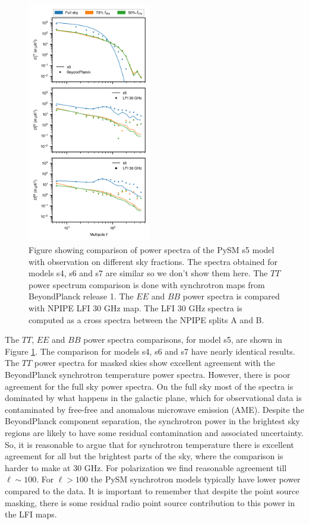 \documentclass[twocolumn]{aastex631}
\begin{document}
\begin{figure}
    \centering
    \includegraphics[width=0.48\textwidth]{figures/Dlcomp_PySM3-4b7_s5_vs_BPnLFI30_BPI.png}
    \caption{Figure showing comparison of power spectra of the PySM s5 model with observation on different sky fractions. The spectra obtained for models s4, s6 and s7 are similar so we don't show them here. The $TT$ power spectrum comparison is done with synchrotron maps from BeyondPlanck release 1. The $EE$ and $BB$ power spectra is compared with NPIPE LFI 30 GHz map. The LFI 30 GHz spectra is computed as a cross spectra between the NPIPE splits A and B.}
    \label{fig:Dl_sync_galmask}
\end{figure}

The $TT$, $EE$ and $BB$ power spectra comparisons, for model s5, are shown in Figure \ref{fig:Dl_sync_galmask}. The comparison for models s4, s6 and s7 have nearly identical results. The $TT$ power spectra for masked skies show excellent agreement with the BeyondPlanck synchrotron temperature power spectra. However, there is poor agreement for the full sky power spectra. On the full sky most of the spectra is dominated by what happens in the galactic plane, which for observational data is contaminated by free-free and anomalous microwave emission (AME). Despite the BeyondPlanck component separation, the synchrotron power in the brightest sky regions are likely to have some residual contamination and associated uncertainty. So, it is reasonable to argue that for synchrotron temperature there is excellent agreement for all but the brightest parts of the sky, where the comparison is harder to make at 30 GHz. For polarization we find reasonable agreement till $\ell \sim 100$. For $\ell > 100$ the PySM synchrotron models typically have lower power compared to the data. It is important to remember that despite the point source masking, there is some residual radio point source contribution to this power in the LFI maps.
\end{document}
